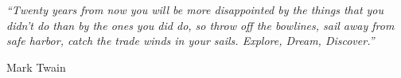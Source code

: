 \pagestyle{empty}
\cleardoublepage
\null\vfill
\textit{``Twenty years from now you will be more disappointed by the things that you didn't do than by the ones you did do, so throw off the bowlines, sail away from safe harbor, catch the trade winds in your sails.  Explore, Dream, Discover.''}

\begin{flushright}
Mark Twain
\end{flushright}

\vfill\vfill\vfill\vfill\vfill\vfill\null
\clearpage